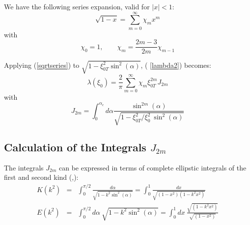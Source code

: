 We have the following series expansion, valid for $|x|<1$:
\begin{equation}  \label{sqrtseries}
\sqrt{1-x} = \sum_{m=0}^{\infty} \chi_m x^m
\end{equation}
with
\begin{equation}
\chi_0 = 1,\qquad \chi_m = \frac{2m-3}{2m} \chi_{m-1}
\end{equation}

Applying (\ref{sqrtseries}) to $\sqrt{1-\xi _{0T}^{2}\sin ^{2}(\alpha )}$, (%
\ref{lambda2}) becomes:
\begin{equation}
\lambda (\xi _{0})=\frac{2}{\pi }\sum_{m=0}^{\infty }\chi _{m}\xi
_{0T}^{2m}J_{2m}  \label{lambdacalc}
\end{equation}
with
\begin{equation}
J_{2m}=\int_{0}^{\alpha _{c}}d\alpha \frac{\sin ^{2m}(\alpha )}{\sqrt{1-\xi
_{0T}^{2}/\xi _{0}^{2}\ \sin ^{2}(\alpha )}}  \label{j2m}
\end{equation}

\subsection{Calculation of the Integrals $J_{2m}$}

The integrals $J_{2m}$ can be expressed in terms of complete ellipstic
integrals of the first and second kind (\cite{aba70},\cite{kil86}):
\begin{eqnarray}
K(k^{2}) &=&\int_{0}^{\pi /2}\frac{d\alpha }{\sqrt{1-k^{2}\sin ^{2}(\alpha )}%
}=\int_{0}^{1}\frac{dx}{\sqrt{(1-x^{2})(1-k^{2}x^{2})}}  \nonumber
\label{elliptic} \\
E(k^{2}) &=&\int_{0}^{\pi /2}d\alpha \ \sqrt{1-k^{2}\sin ^{2}(\alpha )}%
=\int_{0}^{1}dx\ \frac{\sqrt{(1-k^{2}x^{2})}}{\sqrt{(1-x^{2})}}
\end{eqnarray}

